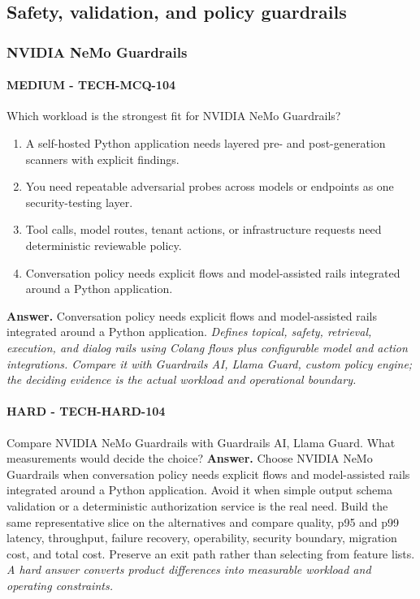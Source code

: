 \subsection{Safety, validation, and policy guardrails}
\subsubsection*{NVIDIA NeMo Guardrails}
\paragraph{MEDIUM - TECH-MCQ-104} Which workload is the strongest fit for NVIDIA NeMo Guardrails?
\begin{enumerate}[label=\Alph*.]
\item A self-hosted Python application needs layered pre- and post-generation scanners with explicit findings.
\item You need repeatable adversarial probes across models or endpoints as one security-testing layer.
\item Tool calls, model routes, tenant actions, or infrastructure requests need deterministic reviewable policy.
\item Conversation policy needs explicit flows and model-assisted rails integrated around a Python application.
\end{enumerate}
\textbf{Answer.} Conversation policy needs explicit flows and model-assisted rails integrated around a Python application.
\textit{Defines topical, safety, retrieval, execution, and dialog rails using Colang flows plus configurable model and action integrations. Compare it with Guardrails AI, Llama Guard, custom policy engine; the deciding evidence is the actual workload and operational boundary.}
\paragraph{HARD - TECH-HARD-104} Compare NVIDIA NeMo Guardrails with Guardrails AI, Llama Guard. What measurements would decide the choice?
\textbf{Answer.} Choose NVIDIA NeMo Guardrails when conversation policy needs explicit flows and model-assisted rails integrated around a Python application. Avoid it when simple output schema validation or a deterministic authorization service is the real need. Build the same representative slice on the alternatives and compare quality, p95 and p99 latency, throughput, failure recovery, operability, security boundary, migration cost, and total cost. Preserve an exit path rather than selecting from feature lists.
\textit{A hard answer converts product differences into measurable workload and operating constraints.}
